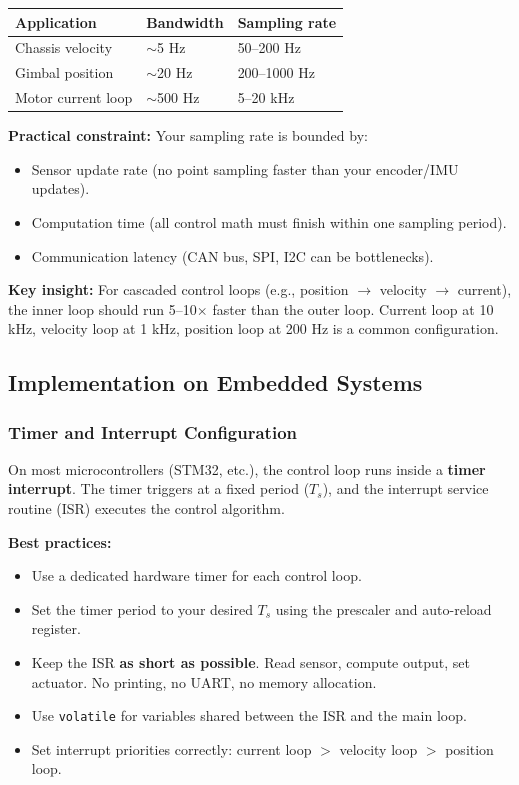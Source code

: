 \begin{center}
\begin{tabular}{lll}
\toprule
\textbf{Application} & \textbf{Bandwidth} & \textbf{Sampling rate} \\
\midrule
Chassis velocity & $\sim$5 Hz & 50--200 Hz \\
Gimbal position & $\sim$20 Hz & 200--1000 Hz \\
Motor current loop & $\sim$500 Hz & 5--20 kHz \\
\bottomrule
\end{tabular}
\end{center}

\textbf{Practical constraint:} Your sampling rate is bounded by:
\begin{itemize}
    \item Sensor update rate (no point sampling faster than your encoder/IMU updates).
    \item Computation time (all control math must finish within one sampling period).
    \item Communication latency (CAN bus, SPI, I2C can be bottlenecks).
\end{itemize}

\textbf{Key insight:} For cascaded control loops (e.g., position $\to$ velocity $\to$ current), the inner loop should run 5--10$\times$ faster than the outer loop. Current loop at 10 kHz, velocity loop at 1 kHz, position loop at 200 Hz is a common configuration.

\subsection{Implementation on Embedded Systems}

\subsubsection{Timer and Interrupt Configuration}

On most microcontrollers (STM32, etc.), the control loop runs inside a \textbf{timer interrupt}. The timer triggers at a fixed period ($T_s$), and the interrupt service routine (ISR) executes the control algorithm.

\textbf{Best practices:}
\begin{itemize}
    \item Use a dedicated hardware timer for each control loop.
    \item Set the timer period to your desired $T_s$ using the prescaler and auto-reload register.
    \item Keep the ISR \textbf{as short as possible}. Read sensor, compute output, set actuator. No printing, no UART, no memory allocation.
    \item Use \texttt{volatile} for variables shared between the ISR and the main loop.
    \item Set interrupt priorities correctly: current loop $>$ velocity loop $>$ position loop.
\end{itemize}

